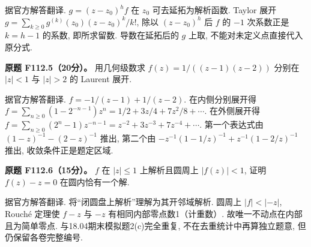 \begin{solution}据官方解答翻译. $g=(z-z_0)^hf$ 在 $z_0$ 可去延拓为解析函数. Taylor 展开 $g=\sum_{k\ge0}g^{(k)}(z_0)(z-z_0)^k/k!$, 除以 $(z-z_0)^h$ 后 $f$ 的 $-1$ 次系数正是 $k=h-1$ 的系数, 即所求留数. 导数在延拓后的 $g$ 上取, 不能对未定义点直接代入原分式.\end{solution}
\begin{exercise}\label{ass:f112-5}
\textbf{原题 F112.5（20分）。} 用几何级数求 $f(z)=1/((z-1)(z-2))$ 分别在 $|z|<1$ 与 $|z|>2$ 的 Laurent 展开.
\end{exercise}
\begin{solution}
据官方解答翻译. $f=-1/(z-1)+1/(z-2)$. 在内侧分别展开得 $f=\sum_{n\ge0}(1-2^{-n-1})z^n=1/2+3z/4+7z^2/8+\cdots$. 在外侧展开得 $f=\sum_{n\ge0}(2^n-1)z^{-n-1}=z^{-2}+3z^{-3}+7z^{-4}+\cdots$. 第一个表达式由 $(1-z)^{-1}-(2-z)^{-1}$ 推出, 第二个由 $-z^{-1}(1-1/z)^{-1}+z^{-1}(1-2/z)^{-1}$ 推出, 收敛条件正是题定区域.
\end{solution}
\begin{exercise}\label{ass:f112-6}
\textbf{原题 F112.6（15分）。} $f$ 在 $|z|\le1$ 上解析且圆周上 $|f(z)|<1$, 证明 $f(z)-z=0$ 在圆内恰有一个解.
\end{exercise}
\begin{solution}据官方解答翻译. 将“闭圆盘上解析”理解为其开邻域解析. 圆周上 $|f|<|-z|$, Rouché 定理使 $f-z$ 与 $-z$ 有相同内部零点数1（计重数）. 故唯一不动点在内部且为简单零点. 与18.04期末模拟题2(c)完全重复, 不在去重统计中再算独立题意, 但仍保留各卷完整编号.\end{solution}

